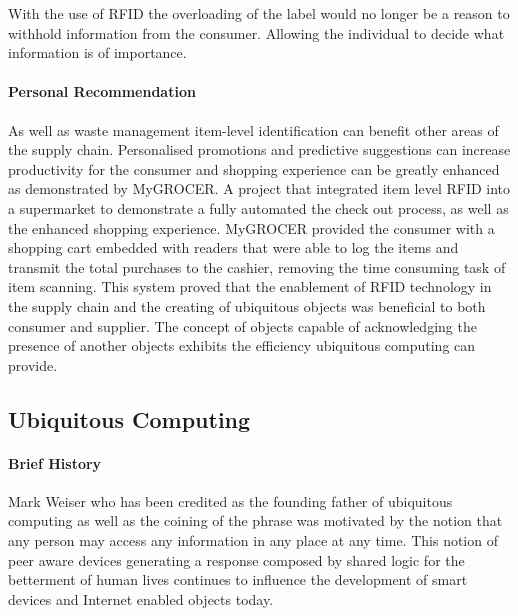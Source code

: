 \documentclass[a4paper, 11pt]{article}
\begin{document}
With the use of RFID the overloading of the label would no longer be a reason to withhold information from the consumer. Allowing the individual to decide what information is of importance.


\paragraph{Personal Recommendation} As well as waste management item-level identification can benefit other areas of the supply chain. Personalised promotions and predictive suggestions can increase productivity for the consumer and shopping experience can be greatly enhanced as demonstrated by MyGROCER\cite{myGrocer}. A project that integrated item level RFID into a supermarket to demonstrate a fully automated the check out process, as well as the enhanced shopping experience. MyGROCER provided the consumer with a shopping cart embedded with readers that were able to log the items and transmit the total purchases to the cashier, removing the time consuming task of item scanning. This system proved that the enablement of RFID technology in the supply chain and the creating of ubiquitous objects was beneficial to both consumer and supplier.\cite{pervasiveComp} The concept of objects capable of acknowledging the presence of another objects exhibits the efficiency ubiquitous computing can provide.

\vspace{\baselineskip}
\vspace{\baselineskip}
\vspace{\baselineskip}

\subsection{Ubiquitous Computing}

\paragraph{Brief History} Mark Weiser who has been credited as the founding father of ubiquitous computing as well as the coining of the phrase was motivated by the notion that any person may access any information in any place at any time.\cite{weiser} This notion of peer aware devices generating a response composed by shared logic for the betterment of human lives continues to influence the development of smart devices and Internet enabled objects today.  
\end{document}
